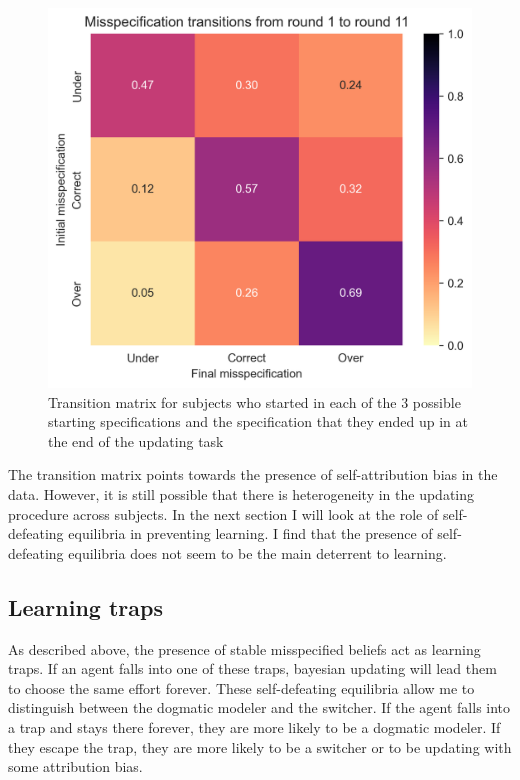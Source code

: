 \documentclass[
  12pt,
]{article}
\begin{document}
\begin{figure}
\hypertarget{fig:transitions}{%
\centering
\includegraphics{../figures/misspecification_transitions.png}
\caption{Transition matrix for subjects who started in each of the 3
possible starting specifications and the specification that they ended
up in at the end of the updating task}\label{fig:transitions}
}
\end{figure}

The transition matrix points towards the presence of self-attribution
bias in the data. However, it is still possible that there is
heterogeneity in the updating procedure across subjects. In the next
section I will look at the role of self-defeating equilibria in
preventing learning. I find that the presence of self-defeating
equilibria does not seem to be the main deterrent to learning.

\hypertarget{learning-traps}{%
\subsection{Learning traps}\label{learning-traps}}

As described above, the presence of stable misspecified beliefs act as
learning traps. If an agent falls into one of these traps, bayesian
updating will lead them to choose the same effort forever. These
self-defeating equilibria allow me to distinguish between the dogmatic
modeler and the switcher. If the agent falls into a trap and stays there
forever, they are more likely to be a dogmatic modeler. If they escape
the trap, they are more likely to be a switcher or to be updating with
some attribution bias.
\end{document}
